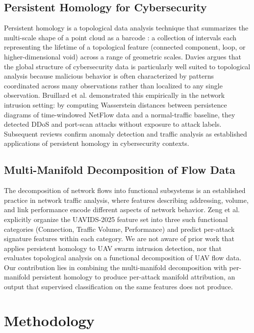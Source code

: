 \documentclass[conf]{new-aiaa}
\begin{document}
\subsection{Persistent Homology for Cybersecurity}

Persistent homology is a topological data analysis technique that summarizes the multi-scale shape of a point cloud as a barcode \cite{Ghrist}: a collection of intervals each representing the lifetime of a topological feature (connected component, loop, or higher-dimensional void) across a range of geometric scales. Davies \cite{Davies} argues that the global structure of cybersecurity data is particularly well suited to topological analysis because malicious behavior is often characterized by patterns coordinated across many observations rather than localized to any single observation. Bruillard et al. \cite{Bruillard} demonstrated this empirically in the network intrusion setting: by computing Wasserstein distances between persistence diagrams of time-windowed NetFlow data and a normal-traffic baseline, they detected DDoS and port-scan attacks without exposure to attack labels. Subsequent reviews \cite{Davies, Eroglu} confirm anomaly detection and traffic analysis as established applications of persistent homology in cybersecurity contexts.

\subsection{Multi-Manifold Decomposition of Flow Data}

The decomposition of network flows into functional subsystems is an established practice in network traffic analysis, where features describing addressing, volume, and link performance encode different aspects of network behavior. Zeng et al. \cite{Zeng} explicitly organize the UAVIDS-2025 feature set into three such functional categories (Connection, Traffic Volume, Performance) and predict per-attack signature features within each category. We are not aware of prior work that applies persistent homology to UAV swarm intrusion detection, nor that evaluates topological analysis on a functional decomposition of UAV flow data. Our contribution lies in combining the multi-manifold decomposition with per-manifold persistent homology to produce per-attack manifold attribution, an output that supervised classification on the same features does not produce.

\section{Methodology}
\end{document}
